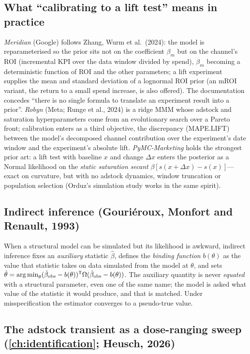 \subsection{What ``calibrating to a lift test'' means in practice}

\emph{Meridian} (Google) follows Zhang, Wurm et al.\ (2024): the model is reparameterised so the prior sits not on the coefficient $\beta_m$ but on the channel's ROI (incremental KPI over the data window divided by spend), $\beta_m$ becoming a deterministic function of ROI and the other parameters; a lift experiment supplies the mean and standard deviation of a lognormal ROI prior (an mROI variant, the return to a small spend increase, is also offered). The documentation concedes ``there is no single formula to translate an experiment result into a prior''. \emph{Robyn} (Meta; Runge et al., 2024) is a ridge MMM whose adstock and saturation hyperparameters come from an evolutionary search over a Pareto front; calibration enters as a third objective, the discrepancy (MAPE.LIFT) between the model's decomposed channel contribution over the experiment's date window and the experiment's absolute lift. \emph{PyMC-Marketing} holds the strongest prior art: a lift test with baseline $x$ and change $\Delta x$ enters the posterior as a Normal likelihood on the \emph{static saturation secant} $\beta[s(x + \Delta x) - s(x)]$---exact on curvature, but with no adstock dynamics, window truncation or population selection (Orduz's simulation study works in the same spirit).

\subsection{Indirect inference (Gouri\'eroux, Monfort and Renault, 1993)}

When a structural model can be simulated but its likelihood is awkward, indirect inference fixes an \emph{auxiliary} statistic $\hat\beta$, defines the \emph{binding function} $b(\theta)$ as the value that statistic takes on data simulated from the model at $\theta$, and sets $\hat\theta = \operatorname*{arg\,min}_\theta (\hat\beta_{\mathrm{obs}} - b(\theta))^{\mathsf{T}}\Omega(\hat\beta_{\mathrm{obs}} - b(\theta))$. The auxiliary quantity is never \emph{equated} with a structural parameter, even one of the same name; the model is asked what value of the statistic it would produce, and that is matched. Under misspecification the estimator converges to a pseudo-true value.

\subsection{The adstock transient as a dose-ranging sweep (\cref{ch:identification}; Heusch, 2026)}

